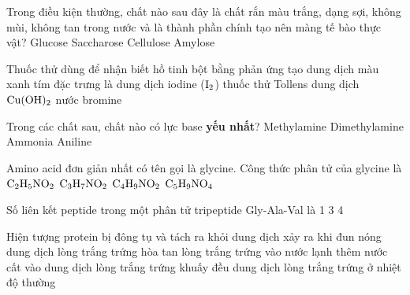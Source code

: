 \documentclass[11pt,a4paper]{article}
\begin{document}
\begin{ex}
Trong điều kiện thường, chất nào sau đây là chất rắn màu trắng, dạng sợi, không mùi, không tan trong nước và là thành phần chính tạo nên màng tế bào thực vật?
\choice
{Glucose}
{Saccharose}
{\True Cellulose}
{Amylose}

\end{ex}
\begin{ex}
Thuốc thử dùng để nhận biết hồ tinh bột bằng phản ứng tạo dung dịch màu xanh tím đặc trưng là
\choice
{\True dung dịch iodine ($\ce{I2}$)}
{thuốc thử Tollens}
{dung dịch $\ce{Cu(OH)2}$}
{nước bromine}

\end{ex}
\begin{ex}
Trong các chất sau, chất nào có lực base \textbf{yếu nhất}?
\choice
{Methylamine}
{Dimethylamine}
{Ammonia}
{\True Aniline}

\end{ex}
\begin{ex}
Amino acid đơn giản nhất có tên gọi là glycine. Công thức phân tử của glycine là
\choice
{\True $\ce{C2H5NO2}$}
{$\ce{C3H7NO2}$}
{$\ce{C4H9NO2}$}
{$\ce{C5H9NO4}$}

\end{ex}
\begin{ex}
Số liên kết peptide trong một phân tử tripeptide Gly-Ala-Val là
\choice
{1}
{}
{3}
{4}

\end{ex}
\begin{ex}
Hiện tượng protein bị đông tụ và tách ra khỏi dung dịch xảy ra khi
\choice
{\True đun nóng dung dịch lòng trắng trứng}
{hòa tan lòng trắng trứng vào nước lạnh}
{thêm nước cất vào dung dịch lòng trắng trứng}
{khuấy đều dung dịch lòng trắng trứng ở nhiệt độ thường}

\end{ex}
\end{document}
